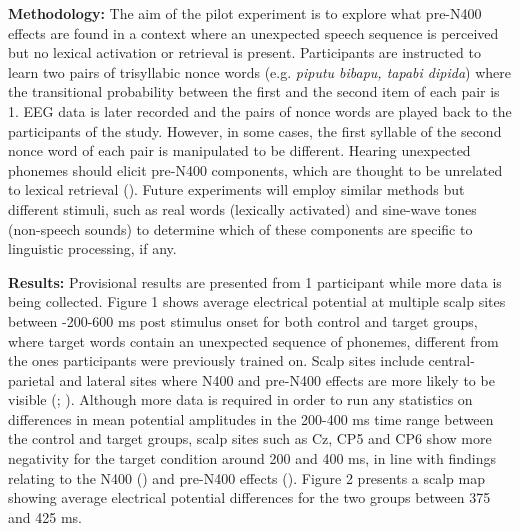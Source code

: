 \documentclass[12pt,a4paper]{article}
\begin{document}
\textbf{Methodology:} The aim of the pilot experiment is to explore what pre-N400 effects are found in a context where an unexpected speech sequence is perceived but no lexical activation or retrieval is present. Participants are instructed to learn two pairs of trisyllabic nonce words (e.g. \textit{piputu bibapu, tapabi dipida}) where the transitional probability between the first and the second item of each pair is 1. EEG data is later recorded and the pairs of nonce words are played back to the participants of the study. However, in some cases, the first syllable of the second nonce word of each pair is manipulated to be different. Hearing unexpected phonemes should elicit pre-N400 components, which are thought to be unrelated to lexical retrieval (\citealt{groppe2010}). Future experiments will employ similar methods but different stimuli, such as real words (lexically activated) and sine-wave tones (non-speech sounds) to determine which of these components are specific to linguistic processing, if any.

\textbf{Results:} Provisional results are presented from 1 participant while more data is being collected. Figure 1 shows average electrical potential at multiple scalp sites between -200-600 ms post stimulus onset for both control and target groups, where target words contain an unexpected sequence of phonemes, different from the ones participants were previously trained on. Scalp sites include central-parietal and lateral sites where N400 and pre-N400 effects are more likely to be visible (\citealt{groppe2010}; \citealt{kutas1980}). Although more data is required in order to run any statistics on differences in mean potential amplitudes in the 200-400 ms time range between the control and target groups, scalp sites such as Cz, CP5 and CP6 show more negativity for the target condition around 200 and 400 ms, in line with findings relating to the N400 (\citealt{kutas1980}) and pre-N400 effects (\citealt{groppe2010}). Figure 2 presents a scalp map showing average electrical potential differences for the two groups between 375 and 425 ms. 
\end{document}
